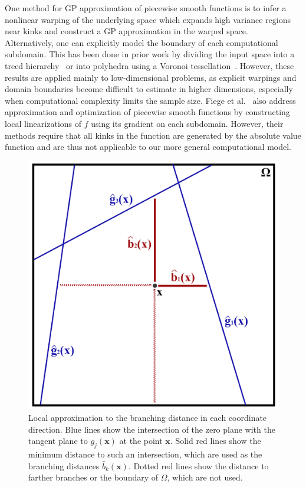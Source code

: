 \documentclass{article}
\renewcommand{\vec}[1]{\mathbf{#1}}
\begin{document}
One method for GP approximation of piecewise smooth functions is to infer a nonlinear warping of the underlying space which expands high variance regions near kinks and construct a GP approximation in the warped space.~\cite{marmin2018warped, xiong2007non} Alternatively, one can explicitly model the boundary of each computational subdomain. This has been done in prior work by dividing the input space into a treed hierarchy~\cite{gramacy2008bayesian} or into polyhedra using a Voronoi tessellation~\cite{kim2005analyzing}. However, these results are applied mainly to low-dimensional problems, as explicit warpings and domain boundaries become difficult to estimate in higher dimensions, especially when computational complexity limits the sample size. Fiege et al.~\cite{fiege2018algorithmic} also address approximation and optimization of piecewise smooth functions by constructing local linearizations of $f$ using its gradient on each subdomain. However, their methods require that all kinks in the function are generated by the absolute value function and are thus not applicable to our more general computational model.

\begin{figure}
		\centering
		\captionsetup{justification=centering}
		\includegraphics[scale=0.7]{figures/branch-approx.png}
		\caption{Local approximation to the branching distance in each coordinate direction. Blue lines show the intersection of the zero plane with the tangent plane to $g_j(\vec{x})$ at the point $\vec{x}$. Solid red lines show the minimum distance to such an intersection, which are used as the branching distances $\hat{b}_k(\vec{x})$. Dotted red lines show the distance to farther branches or the boundary of $\Omega$, which are not used.}
		\label{branch}
\end{figure}
\end{document}

